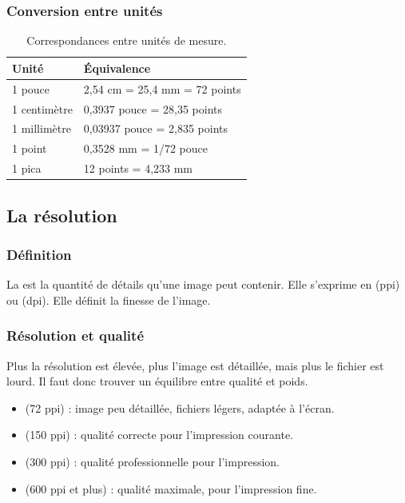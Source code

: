 \subsubsection{Conversion entre unités}

\begin{table}[h!]
\centering
\begin{tabular}{@{}ll@{}}
\toprule
\textbf{Unité} & \textbf{Équivalence} \\
\midrule
1 pouce & 2,54 cm = 25,4 mm = 72 points \\
1 centimètre & 0,3937 pouce = 28,35 points \\
1 millimètre & 0,03937 pouce = 2,835 points \\
1 point & 0,3528 mm = 1/72 pouce \\
1 pica & 12 points = 4,233 mm \\
\bottomrule
\end{tabular}
\caption{Correspondances entre unités de mesure.}
\end{table}

\subsection{La résolution}

\subsubsection{Définition}

La  est la quantité de détails qu'une image peut contenir. Elle s'exprime en  (ppi) ou  (dpi). Elle définit la finesse de l'image.

\subsubsection{Résolution et qualité}

Plus la résolution est élevée, plus l'image est détaillée, mais plus le fichier est lourd. Il faut donc trouver un équilibre entre qualité et poids.

\begin{itemize}
    \item {} (72 ppi) : image peu détaillée, fichiers légers, adaptée à l'écran.
    \item {} (150 ppi) : qualité correcte pour l'impression courante.
    \item {} (300 ppi) : qualité professionnelle pour l'impression.
    \item {} (600 ppi et plus) : qualité maximale, pour l'impression fine.
\end{itemize}

